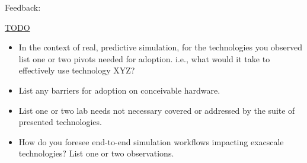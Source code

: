 \documentclass[aspectratio=169]{beamer}
\begin{document}
\begin{frame}{Feedback:}
  \begin{tcolorbox}[colframe=IllinoisOrange]
    \url{TODO}
  \end{tcolorbox}
  \begin{itemize}
    \item In the context of real, predictive simulation, for the technologies
      you observed list one or two pivots needed for adoption.  i.e., what
      would it take to effectively use technology XYZ?
    \item List any barriers for adoption on conceivable hardware.
    \item List one or two lab needs not necessary covered or addressed by the
      suite of presented technologies.
    \item How do you foresee  end-to-end simulation workflows impacting
      exacscale technologies?  List one or two observations.
  \end{itemize}
\end{frame}
\end{document}
